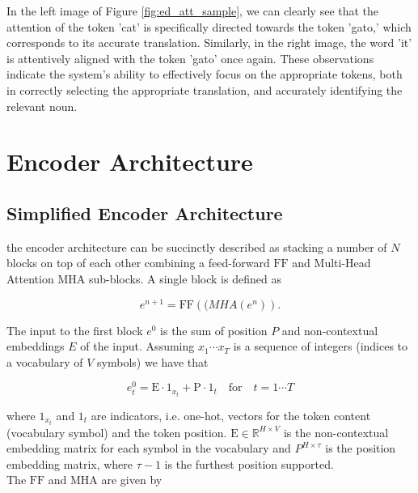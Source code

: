  In the left image of Figure \ref{fig:ed_att_sample}, we can clearly see that the attention of the token 'cat' is specifically directed towards the token 'gato,' which corresponds to its accurate translation. Similarly, in the right image, the word 'it' is attentively aligned with the token 'gato' once again. These observations indicate the system's ability to effectively focus on the appropriate tokens, both in correctly selecting the appropriate translation, and accurately identifying the relevant noun.



\section{Encoder Architecture}

\subsection{Simplified Encoder Architecture}

the encoder architecture can be succinctly described as stacking a number of $N$ blocks on top of each other combining a feed-forward $\mathrm{FF}$ and Multi-Head Attention $\mathrm{MHA}$ sub-blocks. A single block is defined as

\begin{equation}
e^{n+1} = \mathrm{FF}(\mathrm(MHA(e^n)).
\end{equation}

The input to the first block $e^0$ is the sum of position $P$ and non-contextual embeddings $E$ of the input. Assuming $x_1 \cdots x_T$ is a sequence of integers (indices to a vocabulary of $V$ symbols) we have that

\begin{equation}
e^{0}_t = \mathrm{E} \cdot \mathrm{1}_{x_t} + \mathrm{P} \cdot \mathrm{1}_t \quad \mbox{for} \quad t=1 \cdots T
\end{equation}

where $\mathrm{1}_{x_t}$ and $\mathrm{1}_t$ are indicators, i.e. one-hot, vectors for the token content (vocabulary symbol) and the token position. $\mathrm{E} \in \mathbb{R}^{H \times V}$ is the non-contextual embedding matrix for each symbol in the vocabulary and $P^{H \times \tau}$ is the position embedding matrix, where  $\tau-1$ is the furthest position supported.\\

\noindent The $\mathrm{FF}$ and $\mathrm{MHA}$ are given by

